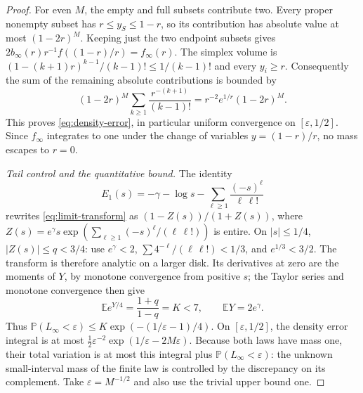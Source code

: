 \documentclass[11pt,letterpaper]{article}
\newcommand{\PP}{\mathbb P}\newcommand{\EE}{\mathbb E}
\begin{document}
\begin{proof}
For even $M$, the empty and full subsets contribute two. Every proper
nonempty subset has $r\le y_S\le1-r$, so its contribution has absolute
value at most $(1-2r)^M$. Keeping just the two endpoint subsets gives
$2b_\infty(r)r^{-1}f((1-r)/r)=f_\infty(r)$.
The simplex volume is
$(1-(k+1)r)^{k-1}/(k-1)!\le1/(k-1)!$ and every $y_i\ge r$.
Consequently the sum of the remaining absolute contributions is bounded by
\[
 (1-2r)^M\sum_{k\ge1}\frac{r^{-(k+1)}}{(k-1)!}
 =r^{-2}e^{1/r}(1-2r)^M.
\]
This proves \eqref{eq:density-error}, in particular uniform convergence
on $[\varepsilon,1/2]$. Since $f_\infty$ integrates to one under the
change of variables $y=(1-r)/r$, no mass escapes to $r=0$.

\emph{Tail control and the quantitative bound.}
The identity
\[
 E_1(s)=-\gamma-\log s-
           \sum_{\ell\ge1}\frac{(-s)^\ell}{\ell\,\ell!}
\]
rewrites \eqref{eq:limit-transform} as $(1-Z(s))/(1+Z(s))$, where
$Z(s)=e^\gamma s\exp(\sum_{\ell\ge1}(-s)^\ell/(\ell\,\ell!))$ is
entire. On $|s|\le1/4$, $|Z(s)|\le q<3/4$: use
$e^\gamma<2$, $\sum4^{-\ell}/(\ell\,\ell!)<1/3$, and
$e^{1/3}<3/2$. The transform is therefore analytic on a larger disk.
Its derivatives at zero are the moments of $Y$, by monotone convergence
from positive $s$; the Taylor series and monotone convergence then give
\[
 \EE e^{Y/4}=\frac{1+q}{1-q}=K<7,
 \qquad \EE Y=2e^\gamma.
\]
Thus $\PP(L_\infty<\varepsilon)
\le K\exp(-(1/\varepsilon-1)/4)$.
On $[\varepsilon,1/2]$, the density error integral is at most
$\tfrac12\varepsilon^{-2}\exp(1/\varepsilon-2M\varepsilon)$.
Because both laws have mass one, their total variation is at most this
integral plus $\PP(L_\infty<\varepsilon)$: the unknown small-interval
mass of the finite law is controlled by the discrepancy on its complement.
Take $\varepsilon=M^{-1/2}$ and also use the trivial upper bound one.
\end{proof}
\end{document}
